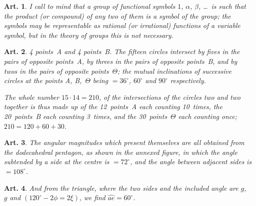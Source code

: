 \documentclass[11pt,a4paper]{article}
\theoremstyle{plain}
\newtheorem{art}{Art.}[section]
\begin{document}
\begin{art}
I call to mind that a group of functional symbols $1$, $\alpha$, $\beta$, \ldots\ is such
that the product (or compound) of any two of them is a symbol of the
group; the symbols may be representable as rational (or irrational)
functions of a variable symbol, but in the theory of groups this is not
necessary.
\end{art}


\begin{art}
4 points~A and 4 points~B. The fifteen circles intersect by fives in the
pairs of opposite points~A, by threes in the pairs of opposite points~B,
and by twos in the pairs of opposite points~$\Theta$; the mutual inclinations
of successive circles at the points A, B,~$\Theta$ being $=36^\circ$, $60^\circ$ and
$90^\circ$ respectively.

The whole number $15 \cdot 14 = 210$, of the intersections of the circles
two and two together is thus made up of the 12~points~A each counting
10~times, the 20~points~B each counting 3~times, and the 30~points~$\Theta$
each counting once; $210 = 120 + 60 + 30$.
\end{art}

\begin{art}
The angular magnitudes which present themselves are all obtained from
the dodecahedral pentagon, as shown in the annexed figure, in which the
angle subtended by a side at the centre is $= 72^\circ$, and the angle between
adjacent sides is $= 108^\circ$.
\end{art}

\begin{art}
And from the triangle, where the two sides and the included angle are
$g$, $g$ and $(120^\circ - 2\phi = 2\xi)$, we find $\widehat{ae} = 60^\circ$.
\end{art}
\end{document}

